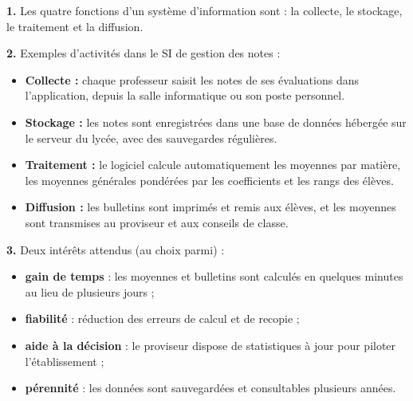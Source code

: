 \documentclass[11pt]{article}
\newcommand{\cle}[1]{{\popxbold\color{popdark}#1}}
\begin{document}
\begin{corrige}
\textbf{1.} Les quatre fonctions d'un système d'information sont : la \cle{collecte}, le \cle{stockage}, le \cle{traitement} et la \cle{diffusion}.

\textbf{2.} Exemples d'activités dans le SI de gestion des notes :
\begin{itemize}
\item \textbf{Collecte :} chaque professeur saisit les notes de ses évaluations dans l'application, depuis la salle informatique ou son poste personnel.
\item \textbf{Stockage :} les notes sont enregistrées dans une base de données hébergée sur le serveur du lycée, avec des sauvegardes régulières.
\item \textbf{Traitement :} le logiciel calcule automatiquement les moyennes par matière, les moyennes générales pondérées par les coefficients et les rangs des élèves.
\item \textbf{Diffusion :} les bulletins sont imprimés et remis aux élèves, et les moyennes sont transmises au proviseur et aux conseils de classe.
\end{itemize}

\textbf{3.} Deux intérêts attendus (au choix parmi) :
\begin{itemize}
\item \textbf{gain de temps} : les moyennes et bulletins sont calculés en quelques minutes au lieu de plusieurs jours ;
\item \textbf{fiabilité} : réduction des erreurs de calcul et de recopie ;
\item \textbf{aide à la décision} : le proviseur dispose de statistiques à jour pour piloter l'établissement ;
\item \textbf{pérennité} : les données sont sauvegardées et consultables plusieurs années.
\end{itemize}
\end{corrige}
\end{document}
